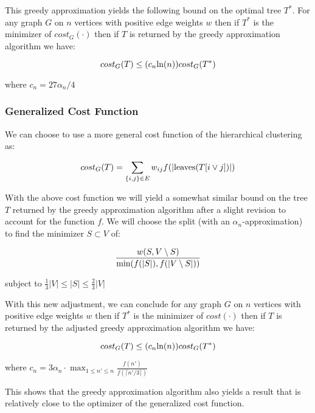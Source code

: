 \documentclass{article}
\begin{document}
This greedy approximation yields the following bound on the optimal tree $T^*$. For any graph $G$ on $n$ vertices with positive edge weights $w$ then if $T^*$ is the minimizer of $cost_G(\cdot)$ then if $T$ is returned by the greedy approximation algorithm we have:

$$cost_G(T) \leq (c_n \hbox{ln}(n)) cost_G(T^*)$$

where $c_n = 27\alpha_n/4$

\subsubsection{Generalized Cost Function}

We can choose to use a more general cost function of the hierarchical clustering as:

$$cost_G(T) = \sum_{\{i, j\} \in E}w_{ij}f(|\hbox{leaves}(T[i \vee j])|)$$

With the above cost function we will yield a somewhat similar bound on the tree $T$ returned by the greedy approximation algorithm after a slight revision to account for the function $f$. We will choose the split (with an $\alpha_n$-approximation) to find the minimizer $S \subset V$  of:

$$\frac{w(S, V \setminus S)}{\hbox{min}(f(|S|), f(|V \setminus S|))}$$

subject to $\frac{1}{3}|V| \leq |S| \leq \frac{2}{3}|V|$

\bigskip

With this new adjustment, we can conclude for any graph $G$ on $n$ vertices with positive edge weights $w$ then if $T^*$ is the minimizer of $cost(\cdot)$ then if $T$ is returned by the adjusted greedy approximation algorithm we have:

$$cost_G(T) \leq (c_n \hbox{ln}(n)) cost_G(T^*)$$

where $c_n = 3\alpha_n \cdot \max_{1 \leq n' \leq n}\frac{f(n')}{f(\lceil n'/3 \rceil)}$

\smallskip
This shows that the greedy approximation algorithm also yields a result that is relatively close to the optimizer of the generalized cost function.
\end{document}
